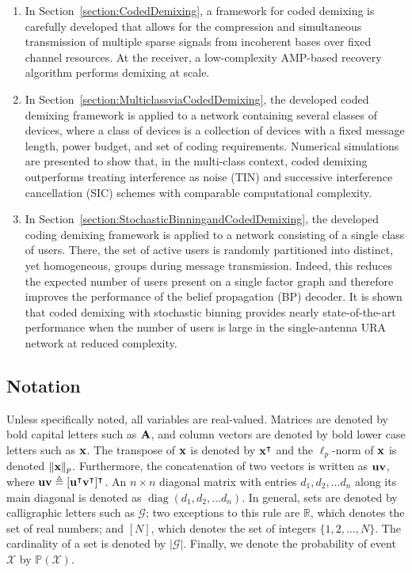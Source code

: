 \documentclass[journal]{IEEEtran}
\begin{document}
\begin{enumerate}
    \item In Section~\ref{section:CodedDemixing}, a framework for coded demixing is carefully developed that allows for the compression and simultaneous transmission of multiple sparse signals from incoherent bases over fixed channel resources.
    At the receiver, a low-complexity AMP-based recovery algorithm performs demixing at scale.
    \item In Section~\ref{section:MulticlassviaCodedDemixing}, the developed coded demixing framework is applied to a network containing several classes of devices, where a class of devices is a collection of devices with a fixed message length, power budget, and set of coding requirements. 
    Numerical simulations are presented to show that, in the multi-class context, coded demixing outperforms treating interference as noise (TIN) and successive interference cancellation (SIC) schemes with comparable computational complexity.
    \item In Section~\ref{section:StochasticBinningandCodedDemixing}, the developed coding demixing framework is applied to a network consisting of a single class of users.
    There, the set of active users is randomly partitioned into distinct, yet homogeneous, groups during message transmission. 
    Indeed, this reduces the expected number of users present on a single factor graph and therefore improves the performance of the belief propagation (BP) decoder. 
    It is shown that coded demixing with stochastic binning provides nearly state-of-the-art performance when the number of users is large in the single-antenna URA network at reduced complexity.
\end{enumerate}

\subsection{Notation}
Unless specifically noted, all variables are real-valued.  
Matrices are denoted by bold capital letters such as $\mathbf{A}$, and column vectors are denoted by bold lower case letters such as $\mathbf{x}$. 
The transpose of $\mathbf{x}$ is denoted by $\mathbf{x}^\intercal$ and the $\ell_p$-norm of $\mathbf{x}$ is denoted $\| \mathbf{x} \|_{p}$. 
Furthermore, the concatenation of two vectors is written as $\mathbf{u}\mathbf{v}$, where $\mathbf{u}\mathbf{v} \triangleq [\mathbf{u}^\intercal \mathbf{v}^\intercal]^\intercal$. 
An $n \times n$ diagonal matrix with entries $d_1, d_2, \hdots d_n$ along its main diagonal is denoted as $\operatorname{diag}\left(d_1, d_2, \hdots d_n\right)$.
In general, sets are denoted by calligraphic letters such as $\mathcal{G}$; two exceptions to this rule are $\mathbb{R}$, which denotes the set of real numbers; and $[N]$, which denotes the set of integers $\{ 1, 2, \ldots, N \}$. 
The cardinality of a set is denoted by $|\mathcal{G}|$.
Finally, we denote the probability of event $\mathcal{X}$ by $\mathbb{P}\left(\mathcal{X}\right)$. 
\end{document}
